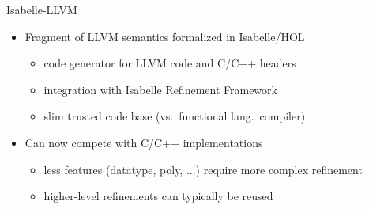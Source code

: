 \documentclass[fleqn]{beamer}
\begin{document}
{

\begin{frame}{Isabelle-LLVM}
  \begin{itemize}
   \item<+-> Fragment of LLVM semantics formalized in Isabelle/HOL
    \begin{itemize}
     \item code generator for LLVM code and C/C++ headers
     \item integration with Isabelle Refinement Framework
     \item slim trusted code base (vs.~functional lang.~compiler)
    \end{itemize}
   \item<+-> {\color{blue}Can now compete with C/C++ implementations}
    \begin{itemize}
     \item less features (datatype, poly, ...) require more complex refinement
     \item higher-level refinements can typically be reused

    \end{itemize}
  \end{itemize}
\end{frame}
}
\end{document}
